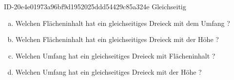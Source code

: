 \begin{exercise}
      {ID-20e4e01973a96bf9d1952025ddd54429c85a324e}
      {Gleichseitig}
  \ifproblem\problem
    \begin{enumerate}[a)]
      \item Welchen Flächeninhalt hat ein gleichseitiges Dreieck mit dem Umfang ?
      \item Welchen Flächeninhalt hat ein gleichseitiges Dreieck mit der Höhe ?
      \item Welchen Umfang hat ein gleichseitiges Dreieck mit Flächeninhalt ?
      \item Welchen Umfang hat ein gleichseitiges Dreieck mit der Höhe ?
    \end{enumerate}
  \fi
\end{exercise}

